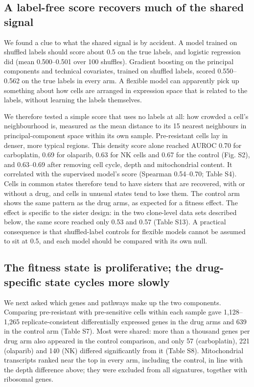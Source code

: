 \documentclass[11pt,a4paper]{article}
\begin{document}
\subsection*{A label-free score recovers much of the shared signal}

We found a clue to what the shared signal is by accident. A model trained on shuffled labels should score about 0.5 on the true labels, and logistic regression did (mean 0.500--0.501 over 100 shuffles). Gradient boosting on the principal components and technical covariates, trained on shuffled labels, scored 0.550--0.562 on the true labels in every arm. A flexible model can apparently pick up something about how cells are arranged in expression space that is related to the labels, without learning the labels themselves.

We therefore tested a simple score that uses no labels at all: how crowded a cell's neighbourhood is, measured as the mean distance to its 15 nearest neighbours in principal-component space within its own sample. Pre-resistant cells lay in denser, more typical regions. This density score alone reached AUROC 0.70 for carboplatin, 0.69 for olaparib, 0.63 for NK cells and 0.67 for the control (Fig. S2), and 0.63--0.69 after removing cell cycle, depth and mitochondrial content. It correlated with the supervised model's score (Spearman 0.54--0.70; Table S4). Cells in common states therefore tend to have sisters that are recovered, with or without a drug, and cells in unusual states tend to lose them. The control arm shows the same pattern as the drug arms, as expected for a fitness effect. The effect is specific to the sister design: in the two clone-level data sets described below, the same score reached only 0.53 and 0.57 (Table S13). A practical consequence is that shuffled-label controls for flexible models cannot be assumed to sit at 0.5, and each model should be compared with its own null.

\subsection*{The fitness state is proliferative; the drug-specific state cycles more slowly}

We next asked which genes and pathways make up the two components. Comparing pre-resistant with pre-sensitive cells within each sample gave 1,128--1,265 replicate-consistent differentially expressed genes in the drug arms and 639 in the control arm (Table S7). Most were shared: more than a thousand genes per drug arm also appeared in the control comparison, and only 57 (carboplatin), 221 (olaparib) and 140 (NK) differed significantly from it (Table S8). Mitochondrial transcripts ranked near the top in every arm, including the control, in line with the depth difference above; they were excluded from all signatures, together with ribosomal genes.
\end{document}
